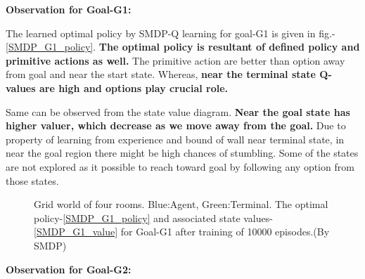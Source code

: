 \documentclass[preprint,12pt]{elsarticle}
\begin{document}
\textbf{Observation for Goal-G1:}

The learned optimal policy by SMDP-Q learning for goal-G1 is given in fig.-\ref{SMDP_G1_policy}. \textbf{The optimal policy is resultant of defined policy and primitive actions as well.} The primitive action are better than option away from goal and near the start state. Whereas, \textbf{near the terminal state Q-values are high and options play crucial role.}

Same can be observed from the state value diagram. \textbf{Near the goal state has higher valuer, which decrease as we move away from the goal.} Due to property of learning from experience and bound of wall near terminal state, in near the goal region there might be high chances of stumbling.  Some of the states are not explored as it possible to reach toward goal by following any option from those states. 

\begin{figure}[H]
	\centering  
	\caption{Grid world of four rooms.  Blue:Agent, Green:Terminal. The optimal policy-\ref{SMDP_G1_policy} and associated state values-\ref{SMDP_G1_value} for Goal-G1 after training of 10000 episodes.(By SMDP)}
	\label{fig:SMDP_G1}
\end{figure}

\newpage

\textbf{Observation for Goal-G2:}
\end{document}
